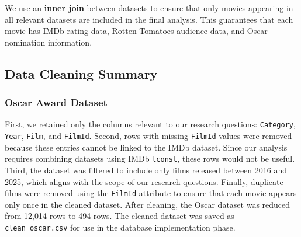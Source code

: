 \documentclass[12pt]{article}
\begin{document}
We use an \textbf{inner join} between datasets to ensure that only movies appearing in all relevant datasets are included in the final analysis. This guarantees that each movie has IMDb rating data, Rotten Tomatoes audience data, and Oscar nomination information.

\subsection{Data Cleaning Summary}

\subsubsection{Oscar Award Dataset}
First, we retained only the columns relevant to our research questions: \texttt{Category}, \texttt{Year}, \texttt{Film}, and \texttt{FilmId}. Second, rows with missing \texttt{FilmId} values were removed because these entries cannot be linked to the IMDb dataset. Since our analysis requires combining datasets using IMDb \texttt{tconst}, these rows would not be useful. Third, the dataset was filtered to include only films released between 2016 and 2025, which aligns with the scope of our research questions. Finally, duplicate films were removed using the \texttt{FilmId} attribute to ensure that each movie appears only once in the cleaned dataset. After cleaning, the Oscar dataset was reduced from 12,014 rows to 494 rows. The cleaned dataset was saved as \texttt{clean\_oscar.csv} for use in the database implementation phase.
\end{document}
